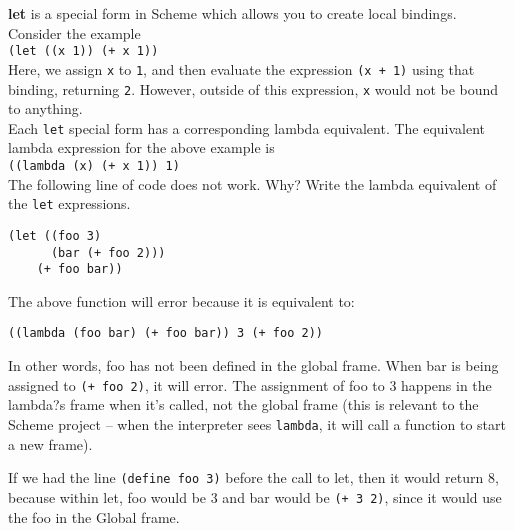 \begin{blocksection}
\question
\textbf{let} is a special form in Scheme which allows you to create local bindings. Consider the example \\
\texttt{(let ((x 1)) (+ x 1))}\\
Here, we assign \texttt{x} to \texttt{1}, and then evaluate the expression \texttt{(x + 1)} using that binding, returning \texttt{2}. However, outside of this expression, \texttt{x} would not be bound to anything. \\
Each \texttt{let} special form has a corresponding lambda equivalent. The equivalent lambda expression for the above example is \\
\texttt{((lambda (x) (+ x 1)) 1)}\\
The following line of code does not work. Why? Write the lambda
equivalent of the \texttt{let} expressions.

\begin{lstlisting}
(let ((foo 3)
      (bar (+ foo 2)))
    (+ foo bar))
\end{lstlisting}
\begin{solution}[0.5in]
The above function will error because it is equivalent to:
\begin{lstlisting}
((lambda (foo bar) (+ foo bar)) 3 (+ foo 2))
\end{lstlisting}

In other words, foo has not been defined in the global frame. When bar is being
assigned to \texttt{(+ foo 2)}, it will error. The assignment of foo to 3
happens in the lambda?s frame when it's called, not the global frame (this is
relevant to the Scheme project -- when the interpreter sees \texttt{lambda}, it
will call a function to start a new frame).

If we had the line \texttt{(define foo 3)} before the call to let, then it would
return 8, because within let, foo would be 3 and bar would be \texttt{(+ 3 2)},
since it would use the foo in the Global frame.
\end{solution}

\end{blocksection}
